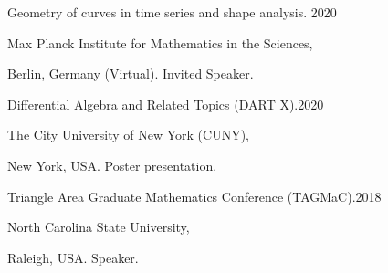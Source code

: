 \documentclass{article}
\begin{document}
\medskip
Geometry of curves in time series and shape analysis. \hfill 2020

Max Planck Institute for Mathematics in the Sciences,

Berlin, Germany (Virtual). Invited Speaker.


\medskip
Differential Algebra and Related Topics (DART X).\hfill 2020

The City University of New York (CUNY), 

New York, USA. Poster presentation.

\medskip
Triangle Area Graduate Mathematics Conference (TAGMaC).\hfill 2018

North Carolina State University,  

 Raleigh, USA. Speaker.
%
%
%

%
%
%
%
%

%
%
%
%
%
%
%
%
%
%
%
%
%

%
%
\bigskip
\bigskip
\end{document}
